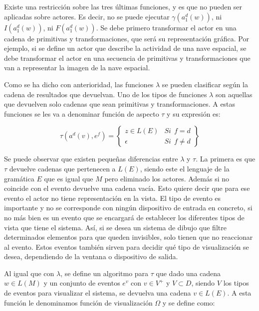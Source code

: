 \documentclass{egpubl}
\begin{document}
Existe una restricci\'on sobre las tres \'ultimas funciones, y es que
no pueden ser aplicadas sobre actores. Es decir, no se puede ejecutar
$\gamma(a_{1}^{d}(w))$, ni
$I(a_{1}^{d}(w))$, ni
$F(a_{1}^{d}(w))$. Se debe primero
transformar el actor en una cadena de primitivas y transformaciones,
que ser\'a su representaci\'on gr\'afica. Por ejemplo, si se define
un actor que describe la actividad de una nave espacial, se debe
transformar el actor en una secuencia de primitivas y transformaciones
que van a representar la imagen de la nave espacial.

Como se ha dicho con anterioridad, las funciones $\lambda$ se pueden
clasificar seg\'un la cadena de resultados que devuelvan. Uno de los
tipos de funciones $\lambda$ son aquellas que devuelven solo cadenas
que sean primitivas y transformaciones. A estas funciones se les va a
denominar funci\'on de aspecto $\tau$ y su expresi\'on es:



\begin{equation}
	\tau (a^{d}(v), e^{f}) = \left\{
	\begin{matrix}
		z \in L(E)  & \mathit{Si} \ \ f = d  \\

		\epsilon  & \mathit{Si} \ \ f \neq d  
	\end{matrix}\right\}
\end{equation}


Se puede observar que existen peque\~nas diferencias entre $\lambda$
y $\tau$. La primera es que $\tau$ devuelve cadenas que pertenecen a
$L(E)$, siendo este el lenguaje de la gram\'atica $E$ que es igual que $M$
pero eliminado los actores. Adem\'as si no coincide
con el evento devuelve una cadena vac\'ia. Esto quiere decir que para ese evento
el actor no tiene representaci\'on en la vista. El tipo de evento es
importante y no se corresponde con ning\'un dispositivo de entrada en
concreto, si no m\'as bien es un evento que se encargar\'a de
establecer los diferentes tipos de vista que tiene el sistema. As\'i,
si se desea un sistema de dibujo que filtre determinados elementos para
que queden invisibles, solo tienen que no reaccionar al evento. Estos
eventos tambi\'en sirven para decidir qu\'e tipo de visualizaci\'on se
desea, dependiendo de la ventana o dispositivo de salida.


Al igual que con $\lambda$, se define un algoritmo para
${\tau}$ que dado una cadena $w \in L(M)$ y un conjunto de eventos
$e^{v}$ con $v \in V^{+}$ y $V \subset D$, siendo $V$ los tipos de eventos para
visualizar el sistema, se devuelva una cadena $v \in L(E)$. A
esta funci\'on le denominamos funci\'on de visualizaci\'on $\Omega$ y
se define como:
\end{document}
